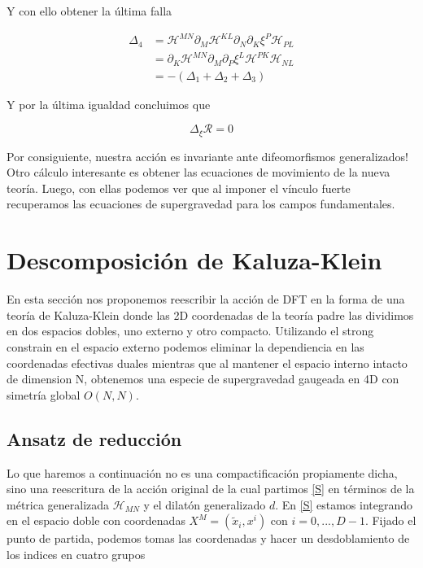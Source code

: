 \documentclass{article}
\numberwithin{equation}{section}
\begin{document}
Y con ello obtener la última falla

\begin{equation}\label{key}
\begin{aligned}
\Delta_4 &= \mathcal{H}^{MN}\partial_M \mathcal{H}^{KL}\partial_N\partial_K \xi^P\mathcal{H}_{PL}\\
&= \partial_K \mathcal{H}^{MN}\partial_M\partial_P \xi^L \mathcal{H}^{PK}\mathcal{H}_{NL}\\
&= - \left( \Delta_1 + \Delta_2 + \Delta_3\right)
\end{aligned}
\end{equation}

Y por la última igualdad concluimos que 

\begin{boxeq}
	\begin{equation}\label{key}
	\Delta_{\xi} \mathcal{R} = 0
	\end{equation}
\end{boxeq}

Por consiguiente, nuestra acción es invariante ante difeomorfismos generalizados!\\

Otro cálculo interesante es obtener las ecuaciones de movimiento de la nueva teoría. Luego, con ellas podemos ver que al imponer el vínculo fuerte recuperamos las ecuaciones de supergravedad para los campos fundamentales.



\section{Descomposición de Kaluza-Klein}\label{sec_DFTKK}

En esta sección nos proponemos reescribir la acción de DFT en la forma de una teoría de Kaluza-Klein donde las 2D coordenadas de la teoría padre las dividimos en dos espacios dobles, uno externo y otro compacto. Utilizando el strong constrain en el espacio externo podemos eliminar la dependiencia en las coordenadas efectivas duales mientras que al mantener el espacio interno intacto de dimension N, obtenemos una especie de supergravedad gaugeada en 4D con simetría global $ O(N,N) $.

\subsection{Ansatz de reducción}\label{sec_ansatz}

Lo que haremos a continuación no es una compactificación propiamente dicha, sino una reescritura de la acción original de la cual partimos \ref{S} en términos de la métrica generalizada $ \mathcal{H}_{MN} $ y el dilatón generalizado $ d $. En \ref{S} estamos integrando en el espacio doble con coordenadas $ X^M=(\widetilde{x}_i, x^i) $  con $ i=0,...,D-1 $. Fijado el punto de partida, podemos tomas las coordenadas y hacer un desdoblamiento de los indices en cuatro grupos
\end{document}
